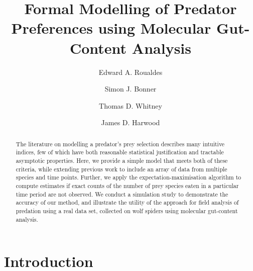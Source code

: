 \documentclass[smallextended]{svjour3}
\begin{document}
\title{Formal Modelling of Predator Preferences using Molecular Gut-Content Analysis}
\author{Edward A. Roualdes \and Simon J. Bonner \and Thomas D. Whitney \and James D. Harwood}

% 
\maketitle

\begin{abstract}
  The literature on modelling a predator's prey selection describes many intuitive indices, few of which have both reasonable statistical justification and tractable asymptotic properties.  Here, we provide a simple model that meets both of these criteria, while extending previous work to include an array of data from multiple species and time points.  Further, we apply the expectation-maximisation algorithm to compute estimates if exact counts of the number of prey species eaten in a particular time period are not observed.  We conduct a simulation study to demonstrate the accuracy of our method, and illustrate the utility of the approach for field analysis of predation using a real data set, collected on wolf spiders using molecular gut-content analysis.
\end{abstract}


\section{Introduction}
\label{intro}
\end{document}
